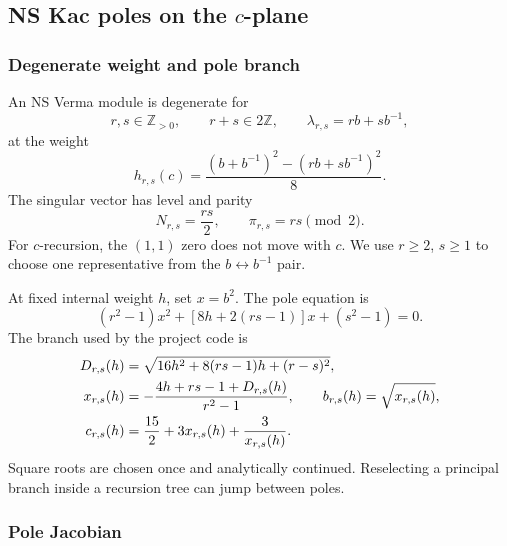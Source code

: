 \documentclass[11pt]{article}
\begin{document}
\subsection{\texorpdfstring{NS Kac poles on the \(c\)-plane}
{NS Kac poles on the c-plane}}
\label{sec:kac-poles}

\subsubsection{Degenerate weight and pole branch}

An NS Verma module is degenerate for
\begin{equation}
 r,s\in\mathbb Z_{>0},
 \qquad r+s\in2\mathbb Z,
 \qquad
 \lambda_{r,s}=rb+s b^{-1},
 \label{eq:kac-labels}
\end{equation}
at the weight
\begin{equation}
 h_{r,s}(c)
 =\frac{(b+b^{-1})^2-(rb+s b^{-1})^2}{8}.
 \label{eq:kac-weight}
\end{equation}
The singular vector has level and parity
\begin{equation}
 N_{r,s}=\frac{rs}{2},
 \qquad
 \pi_{r,s}=rs\pmod2.
 \label{eq:null-level-parity}
\end{equation}
For \(c\)-recursion, the \((1,1)\) zero does not move with \(c\).  We use
\(r\ge2\), \(s\ge1\) to choose one representative from the
\(b\leftrightarrow b^{-1}\) pair.

At fixed internal weight \(h\), set \(x=b^2\).  The pole equation is
\begin{equation}
 (r^2-1)x^2+[8h+2(rs-1)]x+(s^2-1)=0.
 \label{eq:pole-quadratic}
\end{equation}
The branch used by the project code is
\begin{align}
 D_{r,s}(h)
 &=\sqrt{16h^2+8(rs-1)h+(r-s)^2},
 \notag\\
 x_{r,s}(h)
 &=-\frac{4h+rs-1+D_{r,s}(h)}{r^2-1},
 \qquad
 b_{r,s}(h)=\sqrt{x_{r,s}(h)},
 \label{eq:pole-x}\\
 c_{r,s}(h)
 &=\frac{15}{2}+3x_{r,s}(h)+\frac{3}{x_{r,s}(h)}.
 \label{eq:c-pole}
\end{align}
Square roots are chosen once and analytically continued.  Reselecting a
principal branch inside a recursion tree can jump between poles.

\subsubsection{Pole Jacobian}
\end{document}
